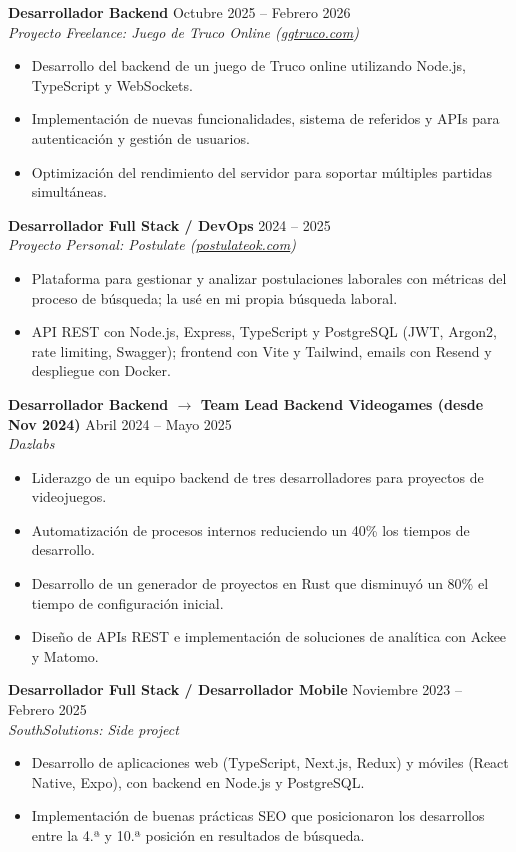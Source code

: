 \documentclass[10pt,a4paper]{article}
\newcommand{\job}[3]{%
  \textbf{#1} \hfill {\small #3}\\
  \textit{#2}%
}
\begin{document}
\vspace{2pt}
\job{Desarrollador Backend}{Proyecto Freelance: Juego de Truco Online (\href{https://ggtruco.com}{ggtruco.com})}{Octubre 2025 -- Febrero 2026}
\begin{itemize}
  \item Desarrollo del backend de un juego de Truco online utilizando Node.js, TypeScript y WebSockets.
  \item Implementación de nuevas funcionalidades, sistema de referidos y APIs para
        autenticación y gestión de usuarios.
  \item Optimización del rendimiento del servidor para soportar múltiples partidas simultáneas.
\end{itemize}

\vspace{2pt}
\job{Desarrollador Full Stack / DevOps}{Proyecto Personal: Postulate (\href{https://postulateok.com}{postulateok.com})}{2024 -- 2025}
\begin{itemize}
  \item Plataforma para gestionar y analizar postulaciones laborales con métricas del proceso
        de búsqueda; la usé en mi propia búsqueda laboral.
  \item API REST con Node.js, Express, TypeScript y PostgreSQL (JWT, Argon2, rate limiting,
        Swagger); frontend con Vite y Tailwind, emails con Resend y despliegue con Docker.
\end{itemize}

\vspace{2pt}
\job{Desarrollador Backend $\rightarrow$ Team Lead Backend Videogames (desde Nov 2024)}{Dazlabs}{Abril 2024 -- Mayo 2025}
\begin{itemize}
  \item Liderazgo de un equipo backend de tres desarrolladores para proyectos de videojuegos.
  \item Automatización de procesos internos reduciendo un 40\% los tiempos de desarrollo.
  \item Desarrollo de un generador de proyectos en Rust que disminuyó un 80\% el tiempo
        de configuración inicial.
  \item Diseño de APIs REST e implementación de soluciones de analítica con Ackee y Matomo.
\end{itemize}

\vspace{2pt}
\job{Desarrollador Full Stack / Desarrollador Mobile}{SouthSolutions: Side project}{Noviembre 2023 -- Febrero 2025}
\begin{itemize}
  \item Desarrollo de aplicaciones web (TypeScript, Next.js, Redux) y móviles (React Native,
        Expo), con backend en Node.js y PostgreSQL.
  \item Implementación de buenas prácticas SEO que posicionaron los desarrollos entre la
        4.ª y 10.ª posición en resultados de búsqueda.
\end{itemize}
\end{document}
